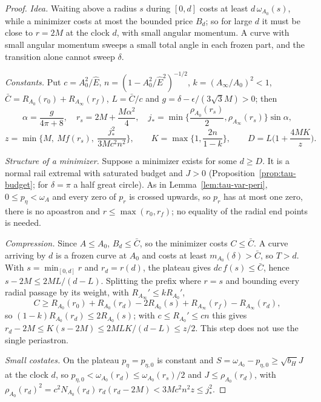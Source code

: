 \documentclass[aip,jmp,amsmath,amssymb,reprint]{revtex4-2}
\newcommand{\Ehat}{\hat E}
\theoremstyle{plain}
\theoremstyle{definition}
\begin{document}
\begin{proof}
\emph{Idea.} Waiting above a radius $s$ during $[0,d]$ costs at least $d\,\omega_{A_0}(s)$, while a minimizer
costs at most the bounded price $B_d$; so for large $d$ it must be close to $r=2M$ at the clock $d$,
with small angular momentum. A curve with small angular momentum sweeps a small total angle in each
frozen part, and the transition alone cannot sweep $\delta$.

\emph{Constants.} Put $c=A_0^2/\Ehat$, $n=(1-A_0^2/\Ehat^2)^{-1/2}$, $k=(A_\infty/A_0)^2<1$,
$\bar C=R_{A_0}(r_0)+R_{A_\infty}(r_f)$, $L=\bar C/c$ and $g=\delta-\epsilon/(3\sqrt3M)>0$; then
\[
  \alpha=\frac g{4\pi+8},\quad r_s=2M+\frac{M\alpha^2}4,\quad
  j_*=\min\Big\{\frac{\rho_{A_0}(r_s)}2,\rho_{A_\infty}(r_s)\Big\}\sin\alpha,
\]
\[
  z=\min\Big\{M,\ Mf(r_s),\ \frac{j_*^2}{3Mc^2n^2}\Big\},\qquad K=\max\Big\{1,\frac{2n}{1-k}\Big\},\qquad
  D=L\Big(1+\frac{4MK}z\Big).
\]

\emph{Structure of a minimizer.} Suppose a minimizer exists for some $d\ge D$. It is a normal rail
extremal with saturated budget and $J>0$ (Proposition~\ref{prop:tau-budget}; for $\delta=\pi$ a half great
circle). As in Lemma~\ref{lem:tau-var-peri}, $0\le p_\eta<\omega_A$ and every zero of $p_r$ is crossed upwards, so
$p_r$ has at most one zero, there is no apoastron and $r\le\max(r_0,r_f)$; no equality of the radial end
points is needed.

\emph{Compression.} Since $A\le A_0$, $B_d\le\bar C$, so the minimizer costs $C\le\bar C$. A curve arriving by $d$
is a frozen curve at $A_0$ and costs at least $m_{A_0}(\delta)>\bar C$, so $T>d$. With $s=\min_{[0,d]}r$ and
$r_d=r(d)$, the plateau gives $dc\,f(s)\le\bar C$, hence $s-2M\le2ML/(d-L)$. Splitting the prefix where $r=s$
and bounding every radial passage by its weight, with $R_{A_\infty}'\le kR_{A_0}'$,
\[
  C\ge R_{A_0}(r_0)+R_{A_0}(r_d)-2R_{A_0}(s)+R_{A_\infty}(r_f)-R_{A_\infty}(r_d),
\]
so $(1-k)R_{A_0}(r_d)\le2R_{A_0}(s)$; with $c\le R_{A_0}'\le cn$ this gives
$r_d-2M\le K(s-2M)\le2MLK/(d-L)\le z/2$. This step does not use the single periastron.

\emph{Small costates.} On the plateau $p_\eta=p_{\eta,0}$ is constant and $S=\omega_{A_0}-p_{\eta,0}\ge\sqrt{b_H}J$ at the clock $d$,
so $p_{\eta,0}<\omega_{A_0}(r_d)\le\omega_{A_0}(r_s)/2$ and $J\le\rho_{A_0}(r_d)$, with
$\rho_{A_0}(r_d)^2=c^2N_{A_0}(r_d)\,r_d(r_d-2M)<3Mc^2n^2z\le j_*^2$.


\end{proof}
\end{document}

